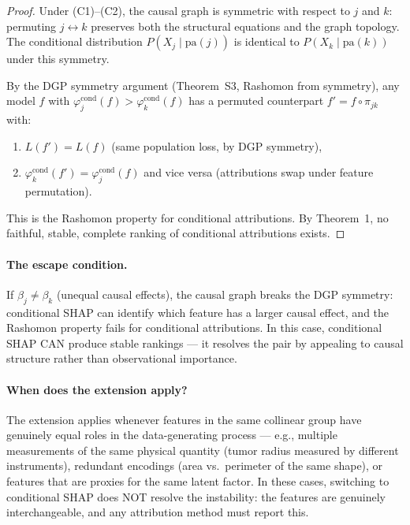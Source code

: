 \documentclass{article}
\begin{document}
\begin{proof}
Under (C1)--(C2), the causal graph is symmetric with respect to
$j$ and $k$: permuting $j \leftrightarrow k$ preserves both the
structural equations and the graph topology. The conditional
distribution $P(X_j \mid \text{pa}(j))$ is identical to
$P(X_k \mid \text{pa}(k))$ under this symmetry.

By the DGP symmetry argument (Theorem~S3, Rashomon from symmetry),
any model $f$ with $\varphi_j^{\text{cond}}(f) > \varphi_k^{\text{cond}}(f)$
has a permuted counterpart $f' = f \circ \pi_{jk}$ with:
\begin{enumerate}
    \item $L(f') = L(f)$ (same population loss, by DGP symmetry),
    \item $\varphi_k^{\text{cond}}(f') = \varphi_j^{\text{cond}}(f)$
      and vice versa (attributions swap under feature permutation).
\end{enumerate}
This is the Rashomon property for conditional attributions.
By Theorem~1, no faithful, stable, complete ranking of conditional
attributions exists.
\end{proof}

\paragraph{The escape condition.}
If $\beta_j \neq \beta_k$ (unequal causal effects), the causal
graph breaks the DGP symmetry: conditional SHAP can identify which
feature has a larger causal effect, and the Rashomon property fails
for conditional attributions. In this case, conditional SHAP CAN
produce stable rankings --- it resolves the pair by appealing to
causal structure rather than observational importance.

\paragraph{When does the extension apply?}
The extension applies whenever features in the same collinear group
have genuinely equal roles in the data-generating process ---
e.g., multiple measurements of the same physical quantity (tumor
radius measured by different instruments), redundant encodings
(area vs.\ perimeter of the same shape), or features that are
proxies for the same latent factor. In these cases, switching to
conditional SHAP does NOT resolve the instability: the features
are genuinely interchangeable, and any attribution method must
report this.
\end{document}
